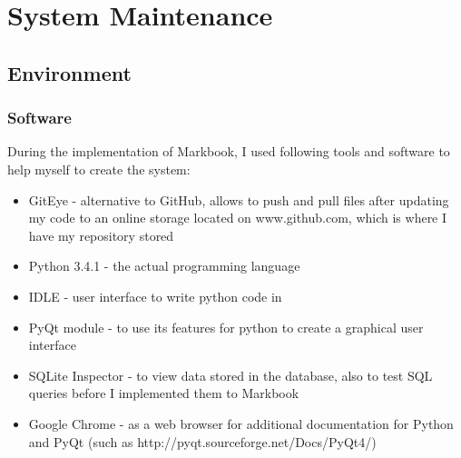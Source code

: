\chapter{System Maintenance}

\section{Environment}

\subsection{Software}
During the implementation of Markbook, I used following tools and software to help myself to create the system:
\begin{itemize}
    \item GitEye - alternative to GitHub, allows to push and pull files after updating my code to an online storage located on www.github.com, which is where I have my repository stored
    \item Python 3.4.1 - the actual programming language
    \item IDLE - user interface to write python code in 
    \item PyQt module - to use its features for python to create a graphical user interface
    \item SQLite Inspector - to view data stored in the database, also to test SQL queries before I implemented them to Markbook
    \item Google Chrome - as a web browser for additional documentation for Python and PyQt (such as http://pyqt.sourceforge.net/Docs/PyQt4/)
\end{itemize}

